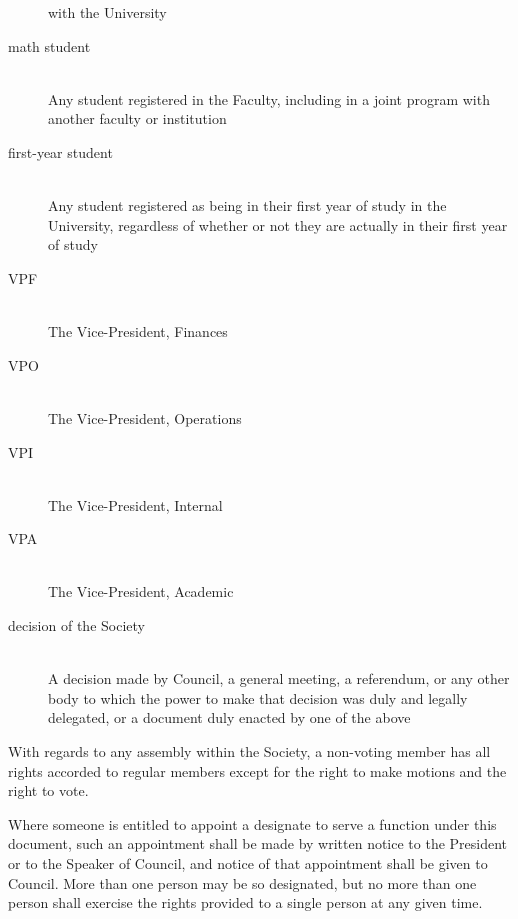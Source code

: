 \begin{description}
  with the University
\item[math student]\hfill\\
  Any student registered in the Faculty, including in a joint program with
  another faculty or institution
\item[first-year student]\hfill\\
  Any student registered as being in their first year of study in the
  University, regardless of whether or not they are actually in their first year
  of study
\item[VPF]\hfill\\
  The Vice-President, Finances
\item[VPO]\hfill\\
  The Vice-President, Operations
\item[VPI]\hfill\\
  The Vice-President, Internal
\item[VPA]\hfill\\
  The Vice-President, Academic
\item[decision of the Society]\hfill\\
  A decision made by Council, a general meeting, a referendum, or any other body
  to which the power to make that decision was duly and legally delegated, or a
  document duly enacted by one of the above
\end{description}

With regards to any assembly within the Society, a non-voting member has all
rights accorded to regular members except for the right to make motions and
the right to vote.

Where someone is entitled to appoint a designate to serve a function
under this document, such an appointment shall be made by written notice to
the President or to the Speaker of Council, and notice of that appointment
shall be given to Council. More than one person may be so designated, but no
more than one person shall exercise the rights provided to a single person at
any given time.